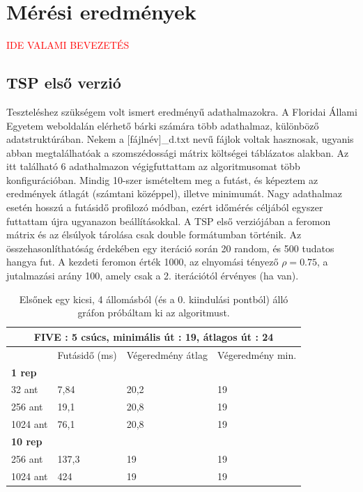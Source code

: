 \section{Mérési eredmények}

\textcolor{red}{IDE VALAMI BEVEZETÉS}

\subsection{TSP első verzió}

Teszteléshez szükségem volt ismert eredményű adathalmazokra. A Floridai Állami Egyetem weboldalán \cite{TSPdataset} elérhető bárki számára több adathalmaz, különböző adatstruktúrában. Nekem a [fájlnév]\_d.txt nevű fájlok voltak hasznosak, ugyanis abban megtalálhatóak a szomszédossági mátrix költségei táblázatos alakban. Az itt található 6 adathalmazon végigfuttattam az algoritmusomat több konfigurációban. Mindig 10-szer ismételtem meg a futást, és képeztem az eredmények átlagát (számtani középpel), illetve minimumát. Nagy adathalmaz esetén hosszú a futásidő profilozó módban, ezért időmérés céljából egyszer futtattam újra ugyanazon beállításokkal. A TSP első verziójában a feromon mátrix és az élsúlyok tárolása csak double formátumban történik. Az összehasonlíthatóság érdekében egy iteráció során 20 random, és 500 tudatos hangya fut. A kezdeti feromon érték 1000, az elnyomási tényező \( \rho = 0.75 \), a jutalmazási arány 100, amely csak a 2. iterációtól érvényes (ha van).



\begin{table}[ht!]
	\centering
	\begin{tabular}{|p{2cm}||p{3cm}|p{3.5cm}|p{3.5cm}|}
		\hline
		\multicolumn{4}{|c|}{FIVE : 5 csúcs, minimális út : 19, átlagos út : 24} \\
		\hline
		& Futásidő (ms) & Végeredmény átlag & Végeredmény min.\\
		\hline
		\textbf{1 rep} & & &\\
		32 ant& 7,84 & 20,2 & 19\\
		256 ant & 19,1 & 20,8 & 19\\
		1024 ant & 76,1 &	20,8 &	19\\
		\hline
		\textbf{10 rep} & & &\\
		256 ant &	137,3 & 19 &	19\\
		1024 ant & 424 &	19 &	19\\
		\hline
	\end{tabular}
	\caption{Elsőnek egy kicsi, 4 állomásból (és a 0. kiindulási pontból) álló gráfon próbáltam ki az algoritmust.}
	\label{table:TSPv1_5}
\end{table}


